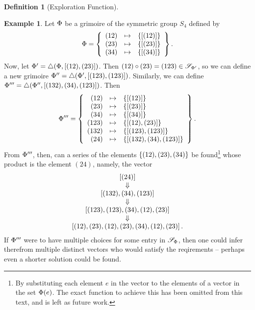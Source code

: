 \documentclass[a4paper,twoside,12pt,openany]{report}
\theoremstyle{plain}
\theoremstyle{definition}
\newtheorem{definition}{Definition}
\newtheorem{example}{Example}
\theoremstyle{remark}
\begin{document}
\begin{definition}[Exploration Function]
\begin{example}
	Let \(\Phi\) be a grimoire of the symmetric group \(S_4\) defined by 
	\[
		\Phi = \left\{ 
			\begin{array}{rcl}
				(12) &\mapsto &\left\{ \left[ (12) \right] \right\} \\
				(23) &\mapsto &\left\{ \left[ (23) \right] \right\} \\
				(34) &\mapsto &\left\{ \left[ (34) \right] \right\} \\
			\end{array}
		 \right\}.
	\]
	Now, let \(\Phi'=\triangle(\Phi, \left[ (12),(23) \right])\). Then \((12)\circ(23)=(123)\in \mathscr{S}_{\Phi'}\), so we can define a new grimoire \(\Phi''=\triangle(\Phi', \left[ (123),(123) \right])\). Similarly, we can define \(\Phi'''=\triangle(\Phi'',\left[ (132),(34),(123) \right])\). Then 
	\[
		\Phi''' = \left\{ 
			\begin{array}{rcl}
				(12) &\mapsto &\left\{ \left[ (12) \right] \right\} \\
				(23) &\mapsto &\left\{ \left[ (23) \right] \right\} \\
				(34) &\mapsto &\left\{ \left[ (34) \right] \right\} \\
				(123) &\mapsto &\left\{ \left[ (12),(23) \right] \right\} \\
				(132) &\mapsto &\left\{ \left[ (123),(123) \right] \right\} \\
				(24) &\mapsto &\left\{ \left[ (132),(34),(123) \right] \right\} \\
			\end{array}
		 \right\}.
	\]
	From \(\Phi'''\), then, can a series of the elements \(\left\{ (12),(23),(34) \right\}\) be found\footnote{By substituting each element \(e\) in the vector to the elements of a vector in the set \(\Phi(e)\). The exact function to achieve this has been omitted from this text, and is left as future work.} whose product is the element \((24)\), namely, the vector 
	\[
		\begin{array}{ccl}
			\left[ (24) \right] \\
			\Downarrow \\
			\left[ (132),(34),(123) \right] \\
			\Downarrow \\
			\left[ (123),(123),(34),(12),(23) \right] \\
			\Downarrow \\
			\left[ (12),(23),(12),(23),(34),(12),(23) \right]. \\
		\end{array}
	\]
	If \(\Phi'''\) were to have multiple choices for some entry in \(\mathscr{S}_{\Phi}\), then one could infer therefrom multiple distinct vectors who would satisfy the reqirements -- perhaps even a shorter solution could be found.


\end{example}
\end{definition}
\end{document}
